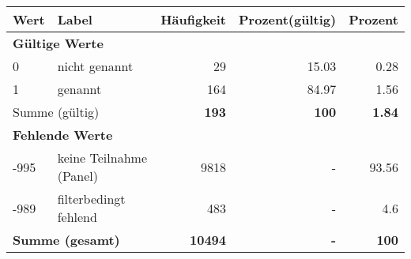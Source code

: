      \begin{longtable}{lXrrr}
     \toprule
     \textbf{Wert} & \textbf{Label} & \textbf{Häufigkeit} & \textbf{Prozent(gültig)} & \textbf{Prozent} \\
     \endhead
     \midrule
     \multicolumn{5}{l}{\textbf{Gültige Werte}}\\

     0 &
     \multicolumn{1}{X}{ nicht genannt   } &


       \num{29} &
       \num[round-mode=places,round-precision=2]{15,03} &
         \num[round-mode=places,round-precision=2]{0,28} \\

     1 &
     \multicolumn{1}{X}{ genannt   } &


       \num{164} &
       \num[round-mode=places,round-precision=2]{84,97} &
         \num[round-mode=places,round-precision=2]{1,56} \\
     \midrule
     \multicolumn{2}{l}{Summe (gültig)} &
       \textbf{\num{193}} &
     \textbf{100} &
       \textbf{\num[round-mode=places,round-precision=2]{1,84}} \\
     \multicolumn{5}{l}{\textbf{Fehlende Werte}}\\
       -995 &
       keine Teilnahme (Panel) &
         \num{9818} &
        - &
         \num[round-mode=places,round-precision=2]{93,56} \\
       -989 &
       filterbedingt fehlend &
         \num{483} &
        - &
         \num[round-mode=places,round-precision=2]{4,6} \\
     \midrule
     \multicolumn{2}{l}{\textbf{Summe (gesamt)}} &
          \textbf{\num{10494}} &
        \textbf{-} &
        \textbf{100} \\
     \bottomrule
     \end{longtable}
     
